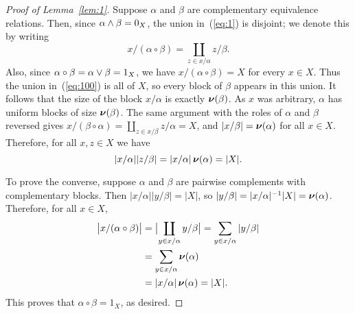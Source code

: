 \begin{proof}[Proof of Lemma~\ref{lem:1}]
Suppose $\alpha$ and $\beta$ are complementary
equivalence relations.  Then, since $\alpha \wedge \beta = 0_X$,
the union in~(\ref{eq:1}) is disjoint; we denote this by writing
  \begin{equation}
    \label{eq:100}
x/(\alpha\circ \beta) = \coprod_{z \in x/\alpha} z/\beta.
  \end{equation}
Also, since 
$\alpha \circ \beta = \alpha \vee \beta = 1_X$, we have 
$x/(\alpha\circ \beta) =  X$ for 
every $x\in X$.
Thus the union in~(\ref{eq:100}) is all of $X$,
so every block of $\beta$ appears in this union.
It follows that the size of the block $x/\alpha$ is exactly $\operatorname{\boldsymbol{\nu}}(\beta)$. 
As $x$ was arbitrary, $\alpha$ has uniform
blocks of size %
$\operatorname{\boldsymbol{\nu}}(\beta)$. 
The same argument with the roles of $\alpha$ and $\beta$ reversed
gives
$x/(\beta \circ \alpha) = \coprod_{z \in x/\beta} z/\alpha = X$, 
and  $|x/\beta| =\operatorname{\boldsymbol{\nu}}(\alpha)$ for all $x\in X$.  Therefore, 
for all $x, z\in X$ we have
\[
|x/\alpha| |z/\beta| 
 = |x/\alpha| \operatorname{\boldsymbol{\nu}}(\alpha) = |X|.
\]

To prove the converse, suppose $\alpha$ and $\beta$ are pairwise complements
with complementary blocks.  Then $|x/\alpha| |y/\beta| = |X|$, 
so $|y/\beta| = |x/\alpha|^{-1}  |X|  = \operatorname{\boldsymbol{\nu}}(\alpha)$. 
Therefore, for all $x\in X$,
\begin{align*}
\bigl|x/(\alpha\circ \beta)\bigr| &= \bigl|\coprod_{y\in x/\alpha} y/\beta\bigr|
= \sum_{y \in x/\alpha} |y/\beta|\\
&= \sum_{y \in x/\alpha} \operatorname{\boldsymbol{\nu}}(\alpha) \\
&= |x/\alpha|\operatorname{\boldsymbol{\nu}}(\alpha) = |X|.
\end{align*}
This proves that $\alpha\circ \beta = 1_X$, as desired.
\end{proof}

